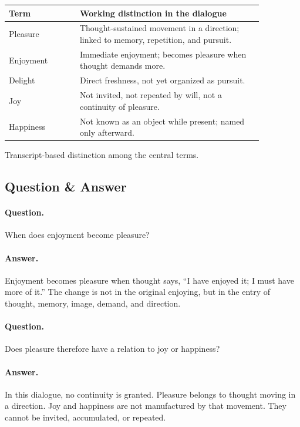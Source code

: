 \begin{table}
\centering
\begin{tabular}{|p{0.24\linewidth}|p{0.62\linewidth}|}
\hline
\textbf{Term} & \textbf{Working distinction in the dialogue} \\
\hline
Pleasure & Thought-sustained movement in a direction; linked to memory, repetition, and pursuit. \\
\hline
Enjoyment & Immediate enjoyment; becomes pleasure when thought demands more. \\
\hline
Delight & Direct freshness, not yet organized as pursuit. \\
\hline
Joy & Not invited, not repeated by will, not a continuity of pleasure. \\
\hline
Happiness & Not known as an object while present; named only afterward. \\
\hline
\end{tabular}

Transcript-based distinction among the central terms.
\end{table}

\subsection{Question \& Answer}

\paragraph{Question.}
When does enjoyment become pleasure?

\paragraph{Answer.}
Enjoyment becomes pleasure when thought says, ``I have enjoyed it; I must have more of it.'' The change is not in the original enjoying, but in the entry of thought, memory, image, demand, and direction.

\paragraph{Question.}
Does pleasure therefore have a relation to joy or happiness?

\paragraph{Answer.}
In this dialogue, no continuity is granted. Pleasure belongs to thought moving in a direction. Joy and happiness are not manufactured by that movement. They cannot be invited, accumulated, or repeated.

